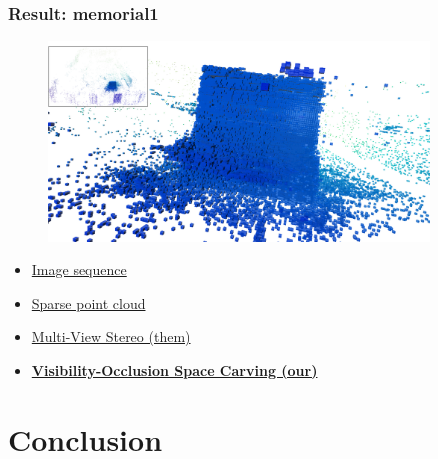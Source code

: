 \documentclass{beamer}
\begin{document}
\begin{frame}
  \frametitle{Result: memorial1}
  \begin{figure}[htb!]
   \centering
   \includegraphics[width=0.9\textwidth]{img/memorial_carve2}  %
  \end{figure}
  \begin{itemize}
    \item \href{run:./vid/09-result3-seq.mp4}{Image sequence} \\
    \item \href{run:./vid/10-result3-sparse.mp4}{Sparse point cloud} \\
    \item \href{run:./vid/11-result3-mvs.mp4}{Multi-View Stereo (them)} \\
    \item \href{run:./vid/12-result3-visocc.mp4}{\textbf{Visibility-Occlusion Space Carving (our)}} \\
  \end{itemize}
\end{frame}


\section{Conclusion}
\end{document}
